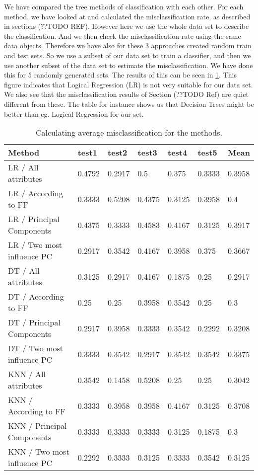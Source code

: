 We have compared the tree methods of classification with each other. For each method, we have looked at and calculated the misclassification rate, as described in sections (??TODO REF). However here we use the whole data set to describe the classification. And we then check the misclassification rate using the same data objects. Therefore we have also for these 3 approaches created random train and test sets. So we use a subset of our data set to train a classifier, and then we use another subset of the data set to estimate the misclassification. We have done this for 5 randomly generated sets. The results of this can be seen in \ref{misclasRes}. This figure indicates that Logical Regression (LR) is not very suitable for our data set. We also see that the misclassification results of Section (??TODO Ref) are quiet different from these. The table for instance shows us that Decision Trees might be better than eg. Logical Regression for our set.

\begin{table}
\begin{tabular}{|l|l|l|l|l|l|l|}
\hline
Method & test1 & test2 & test3 & test4 & test5 & Mean \\ \hline
LR / All attributes & 0.4792 & 0.2917 & 0.5 &   0.375 & 0.3333 & 0.3958\\ \hline
LR / According to FF & 0.3333 & 0.5208 & 0.4375 & 0.3125  &  0.3958 & 0.4    \\ \hline
LR / Principal Components & 0.4375  &  0.3333 & 0.4583 & 0.4167 & 0.3125 &     0.3917 \\ \hline
LR / Two most influence PC & 0.2917 & 0.3542 & 0.4167 & 0.3958 & 0.375    &   0.3667 \\ \hline

DT / All attributes & 0.3125  &    0.2917 & 0.4167 &  0.1875  &    0.25    &    0.2917 \\ \hline
DT / According to FF & 0.25    &    0.25 &    0.3958 & 0.3542 &  0.25    &    0.3        \\ \hline
DT / Principal Components & 0.2917 & 0.3958 & 0.3333 &  0.3542 &  0.2292 &  0.3208 \\ \hline
DT / Two most influence PC &  0.3333 & 0.3542 & 0.2917 & 0.3542 &  0.3542 &  0.3375  \\ \hline

KNN / All attributes & 0.3542 &  0.1458 & 0.5208 & 0.25 &    0.25 &       0.3042 \\ \hline
KNN / According to FF &  0.3333 &  0.3958 &  0.3958 &  0.4167 & 0.3125  &    0.3708 \\ \hline
KNN / Principal Components & 0.3333 &  0.3333 & 0.3333 &  0.3125   &   0.1875 &     0.3    \\ \hline
KNN / Two most influence PC & 0.2292 &  0.3333 &  0.3125  &  0.3333 &  0.3542 &  0.3125   \\ \hline

\end{tabular}
\caption{Calculating average misclassification for the methods.}
\label{misclasRes}
\end{table}

